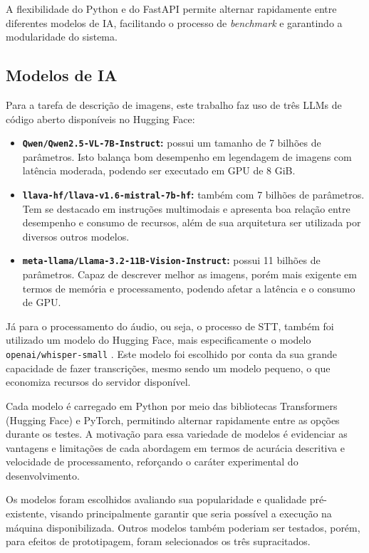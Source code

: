 A flexibilidade do Python e do FastAPI permite alternar rapidamente entre diferentes modelos de IA, facilitando o processo de \textit{benchmark} e garantindo a modularidade do sistema.

\subsection{Modelos de IA}

Para a tarefa de descrição de imagens, este trabalho faz uso de três LLMs de código aberto disponíveis no Hugging Face:

\begin{itemize}
    \item \textbf{\lstinline{Qwen/Qwen2.5-VL-7B-Instruct}:} possui um tamanho de 7 bilhões de parâmetros. Isto balança bom desempenho em legendagem de imagens com latência moderada, podendo ser executado em GPU de 8 GiB.
    \item \textbf{\lstinline{llava-hf/llava-v1.6-mistral-7b-hf}:} também com 7 bilhões de parâmetros. Tem se destacado em instruções multimodais e apresenta boa relação entre desempenho e consumo de recursos, além de sua arquitetura ser utilizada por diversos outros modelos.
    \item \textbf{\lstinline{meta-llama/Llama-3.2-11B-Vision-Instruct}:} possui 11 bilhões de parâmetros. Capaz de descrever melhor as imagens, porém mais exigente em termos de memória e processamento, podendo afetar a latência e o consumo de GPU.
\end{itemize}

Já para o processamento do áudio, ou seja, o processo de STT, também foi utilizado um modelo do Hugging Face, mais especificamente o modelo \lstinline{openai/whisper-small} \cite{radford2023}. Este modelo foi escolhido por conta da sua grande capacidade de fazer transcrições, mesmo sendo um modelo pequeno, o que economiza recursos do servidor disponível.

Cada modelo é carregado em Python por meio das bibliotecas Transformers (Hugging Face) e PyTorch, permitindo alternar rapidamente entre as opções durante os testes. A motivação para essa variedade de modelos é evidenciar as vantagens e limitações de cada abordagem em termos de acurácia descritiva e velocidade de processamento, reforçando o caráter experimental do desenvolvimento.

Os modelos foram escolhidos avaliando sua popularidade e qualidade pré-existente, visando principalmente garantir que seria possível a execução na máquina disponibilizada. Outros modelos também poderiam ser testados, porém, para efeitos de prototipagem, foram selecionados os três supracitados.

